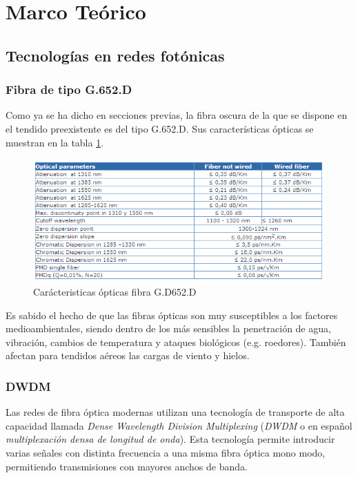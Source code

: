 
\section{Marco Te\'orico}
\label{sec:marcoteorico}

\subsection{Tecnolog\'ias en redes fot\'onicas}
\label{sec:redfotonica}

\subsubsection{Fibra de tipo G.652.D}

Como ya se ha dicho en secciones previas, la fibra oscura de la que se
dispone en el tendido preexistente es del tipo G.652.D. Sus
características ópticas se muestran en la tabla \ref{fig:tablafibra}.

\begin{figure}[H]
  \centering
  \includegraphics[scale=1]{Imagenes/Fibra.png}
  \caption{Carácteristicas ópticas fibra G.D652.D \cite{datasheetfibra}}
  \label{fig:tablafibra}
\end{figure}
  
Es sabido el hecho de que las fibras ópticas son muy susceptibles a
los factores medioambientales, siendo dentro de los más sensibles la
penetración de agua, vibración, cambios de temperatura y ataques
biológicos (e.g. roedores). También afectan para tendidos
aéreos las cargas de viento y hielos.

\subsubsection{DWDM}
\label{sec:dwdm}

Las redes de fibra óptica modernas utilizan una tecnología de
transporte de alta capacidad llamada \emph{Dense Wavelength Division
Multiplexing} (\emph{DWDM} o en español \emph{multiplexación densa de 
longitud de onda}). Esta tecnología permite introducir varias señales 
con distinta frecuencia a una misma fibra óptica mono modo, permitiendo 
transmisiones con mayores anchos de banda.

